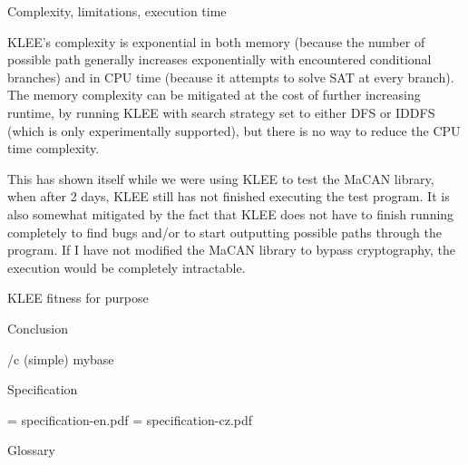 \sec Complexity, limitations, execution time

KLEE's complexity is exponential in both memory (because the number of possible
path generally increases exponentially with encountered conditional branches)
and in CPU time (because it attempts to solve SAT at every branch). The memory
complexity can be mitigated at the cost of further increasing runtime, by
running KLEE with search strategy set to either DFS or IDDFS (which is only
experimentally supported), but there is no way to reduce the CPU time
complexity.

This has shown itself while we were using KLEE to test the MaCAN library, when
after 2 days, KLEE still has not finished executing the test program. It is
also somewhat mitigated by the fact that KLEE does not have to finish running
completely to find bugs and/or to start outputting possible paths through the
program. If I have not modified the MaCAN library to bypass cryptography, the
execution would be completely intractable.

\sec KLEE fitness for purpose

\chap Conclusion



\bibchap
\usebib/c (simple) mybase


\app Specification

\picw=\hsize
\cinspic specification-en.pdf
\vfil\break
\picw=\hsize
\cinspic specification-cz.pdf
\nextoddpage


\app Glossary\par
\makeglos

\nextoddpage

\bye

